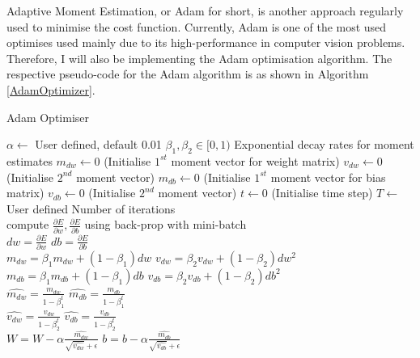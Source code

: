  \label{SADAM}
Adaptive Moment Estimation, or Adam for short, is another approach regularly used to minimise the cost function. Currently, Adam is one of the most used optimises used mainly due to its high-performance in computer vision problems. Therefore, I will also be implementing the Adam optimisation algorithm. The respective pseudo-code for the Adam algorithm is as shown in Algorithm \ref{AdamOptimizer}. 

\begin{algorithm}[H]
\caption{Adam Optimiser}\label{AdamOptimizer}
\begin{algorithmic}[1]
\State $\alpha \gets$ User defined, default 0.01
\State $\beta_1 , \beta_2 \in [0,1)$ Exponential decay rates for moment estimates
\State $m_{dw} \gets 0$ (Initialise $1^{st}$ moment vector for weight matrix)
\State $v_{dw} \gets 0$ (Initialise $2^{nd}$ moment vector)
\State $m_{db} \gets 0$ (Initialise $1^{st}$ moment vector for bias matrix)
\State $v_{db} \gets 0$ (Initialise $2^{nd}$ moment vector)
\State $t \gets 0$ (Initialise time step)
\State $T \gets$ User defined Number of iterations 
\\
\State compute $\frac{\partial E}{\partial w}, \frac{\partial E}{\partial b}$ using back-prop with mini-batch
\\
\State $dw = \frac{\partial E}{\partial w}$
\State $db = \frac{\partial E}{\partial b}$
\\
\State $m_{dw} = \beta_1 m_{dw}  + (1-\beta_1)dw$
\State $v_{dw} = \beta_2 v_{dw} + (1-\beta_2)dw^2$
\\
\State $m_{db} = \beta_1 m_{db}  + (1-\beta_1)db$
\State $v_{db} = \beta_2 v_{db} + (1-\beta_2)db^2$
\\
\State $\hat{m_{dw}} = \frac{m_{dw}}{1-\beta_1^t}$
\State $\hat{m_{db}} = \frac{m_{db}}{1-\beta_1^t}$
\\
\State $\hat{v_{dw}} = \frac{v_{dw}}{1-\beta_2^t}$
\State $\hat{v_{db}} = \frac{v_{db}}{1-\beta_2^t}$
\\
\State $W = W-\alpha \frac{\hat{m_{dw}}}{\sqrt{\hat{v_{dw}}} + \epsilon}$
\State $b = b-\alpha \frac{\hat{m_{db}}}{\sqrt{\hat{v_{db}}} + \epsilon}$
\EndFor
\EndFor
\end{algorithmic}
\end{algorithm}
